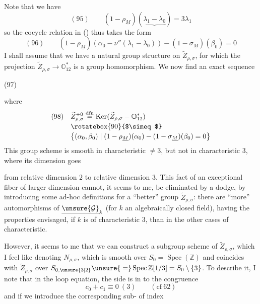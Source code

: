 Note that we have
\[
(95)\qquad (1-\rho_{\underline M})
(\underbrace{\lambda_1-\lambda_0})=3\lambda_1
\]
so the cocycle relation in ()
thus takes the form
\[
(96)\qquad
(1-\rho_{\underline M})(\alpha_0-\nu''(\lambda_1-\lambda_0))
-(1-\sigma_{\underline M})(\beta_0)=0
\]
I shall assume  that we have a natural group structure on
$\widetilde Z_{\rho,\sigma}$, for which the projection
$\widetilde Z_{\rho,\sigma}\to\mathbb O_{12}^{*}$
is a group homomorphism. We now find an exact sequence

\begin{samepage}
(97)
\end{samepage}
where
\[
\begin{aligned}
(98)\quad&\widetilde Z_{\rho,\sigma}^{+0}
\overset{\mathrm{dfn}}=\operatorname{Ker}
(\widetilde Z_{\rho,\sigma}\mathbin{-}\mathbb O_{12}^{*})\\[-2pt]
&\rotatebox{90}{$\simeq$}\\[-2pt]
&\bigl\{(\alpha_0,\beta_0)\mid
(1-\rho_{\underline M})(\alpha_0)-(1-\sigma_{\underline M})(\beta_0)=0\bigr\}
\end{aligned}
\]
This group scheme is smooth in characteristic $\ne3$, but not in characteristic $3$, where its dimension goes


from relative dimension $2$ to relative dimension $3$.
This fact of an exceptional fiber of larger dimension cannot, it seems to me, be
eliminated by a dodge,  by introducing
 some ad-hoc definitions for a ``better'' group
$\widetilde Z_{\rho,\sigma}$: there are ``more'' automorphisms of
$\underline{\unsure{\mathcal G}}_k$ (for $k$ an
algebraically closed field), having the properties envisaged, if $k$ is of characteristic $3$, than in the other cases of characteristic.

However, it seems to me that we can construct a subgroup scheme
 of $\widetilde Z_{\rho,\sigma}$, which I feel like denoting
$N_{\rho,\sigma}$, which is smooth over $S_0=\operatorname{Spec}(\mathbb Z)$ and
coincides with $\widetilde Z_{\rho,\sigma}$ over
$S_{0,\unsure{3|2}}\unsure{{}=}\operatorname{Spec}\mathbb Z[1/3]=S_0\setminus\{3\}$.
To describe it, I note that in the loop equation,
the  side is
 in
to the congruence
\[
c_0+c_1\equiv0\ (3)\qquad(\mathrm{cf}\ 62)
\]
and if we introduce the corresponding sub- of index

